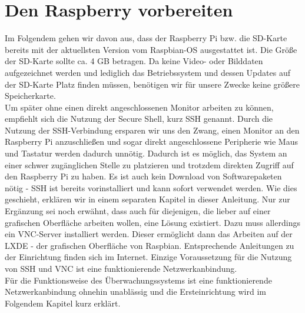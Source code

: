 \documentclass[12pt,a4paper]{scrreprt}
\begin{document}
\section{Den Raspberry vorbereiten}
Im Folgendem gehen wir davon aus, dass der Raspberry Pi bzw. die SD-Karte bereits mit der aktuellsten Version vom Raspbian-OS ausgestattet ist. Die Größe der SD-Karte sollte ca. 4 GB betragen. Da keine Video- oder Bilddaten aufgezeichnet werden und lediglich das Betriebssystem und dessen Updates auf der SD-Karte Platz finden müssen, benötigen wir für unsere Zwecke keine größere Speicherkarte.\\Um später ohne einen direkt angeschlossenen Monitor arbeiten zu können, empfiehlt sich die Nutzung der Secure Shell, kurz SSH genannt. Durch die Nutzung der SSH-Verbindung ersparen wir uns den Zwang, einen Monitor an den Raspberry Pi anzuschließen und sogar direkt angeschlossene Peripherie wie Maus und Tastatur werden dadurch unnötig. Dadurch ist es möglich, das System an einer schwer zugänglichen Stelle zu platzieren und trotzdem direkten Zugriff auf den Raspberry Pi zu haben. Es ist auch kein Download von Softwarepaketen nötig - SSH ist bereits vorinstalliert und kann sofort verwendet werden. Wie dies geschieht, erklären wir in einem separaten Kapitel in dieser Anleitung. Nur zur Ergänzung sei noch erwähnt, dass auch für diejenigen, die lieber auf einer grafischen Oberfläche arbeiten wollen, eine Lösung existiert. Dazu muss allerdings ein VNC-Server installiert werden. Dieser ermöglicht dann das Arbeiten auf der LXDE - der grafischen Oberfläche von Raspbian. Entsprechende Anleitungen zu der Einrichtung finden sich im Internet. Einzige Voraussetzung für die Nutzung von SSH und VNC ist eine funktionierende Netzwerkanbindung. \\Für die Funktionsweise des Überwachungssystems ist eine funktionierende Netzwerkanbindung ohnehin unablässig und die Ersteinrichtung wird im Folgendem Kapitel kurz erklärt.
\end{document}
